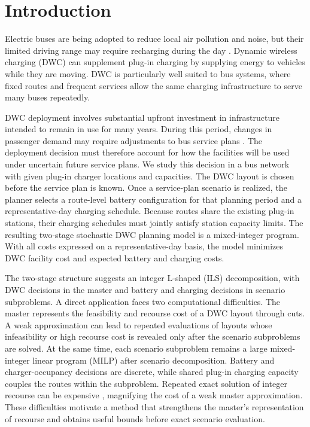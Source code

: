 \FloatBarrier
\section{Introduction}
\label{sec:introduction}

Electric buses are being adopted to reduce local air pollution and noise, but their limited driving range may require recharging during the day \citep{devos_capacitated_2024}.
Dynamic wireless charging (DWC) can supplement plug-in charging by supplying energy to vehicles while they are moving.
DWC is particularly well suited to bus systems, where fixed routes and frequent services allow the same charging infrastructure to serve many buses repeatedly.

DWC deployment involves substantial upfront investment in infrastructure intended to remain in use for many years.
During this period, changes in passenger demand may require adjustments to bus service plans \citep{perumal_review_2022}.
The deployment decision must therefore account for how the facilities will be used under uncertain future service plans.
We study this decision in a bus network with given plug-in charger locations and capacities.
The DWC layout is chosen before the service plan is known.
Once a service-plan scenario is realized, the planner selects a route-level battery configuration for that planning period and a representative-day charging schedule.
Because routes share the existing plug-in stations, their charging schedules must jointly satisfy station capacity limits.
The resulting two-stage stochastic DWC planning model is a mixed-integer program.
With all costs expressed on a representative-day basis, the model minimizes DWC facility cost and expected battery and charging costs.

The two-stage structure suggests an integer L-shaped (ILS) decomposition, with DWC decisions in the master and battery and charging decisions in scenario subproblems.
A direct application faces two computational difficulties.
The master represents the feasibility and recourse cost of a DWC layout through cuts.
A weak approximation can lead to repeated evaluations of layouts whose infeasibility or high recourse cost is revealed only after the scenario subproblems are solved.
At the same time, each scenario subproblem remains a large mixed-integer linear program (MILP) after scenario decomposition.
Battery and charger-occupancy decisions are discrete, while shared plug-in charging capacity couples the routes within the subproblem.
Repeated exact solution of integer recourse can be expensive \citep{larsen_learning_2024}, magnifying the cost of a weak master approximation.
These difficulties motivate a method that strengthens the master's representation of recourse and obtains useful bounds before exact scenario evaluation.

